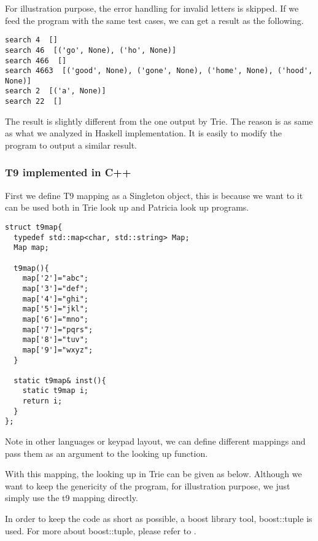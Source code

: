\documentclass{article}
\begin{document}
For illustration purpose, the error handling for invalid letters is skipped.
If we feed the program with the same test cases, we can get a result as the
following.

\begin{verbatim}
search 4  []
search 46  [('go', None), ('ho', None)]
search 466  []
search 4663  [('good', None), ('gone', None), ('home', None), ('hood', None)]
search 2  [('a', None)]
search 22  []
\end{verbatim}

The result is slightly different from the one output by Trie. The reason is
as same as what we analyzed in Haskell implementation. It is easily to modify
the program to output a similar result.

\subsubsection*{T9 implemented in C++}

First we define T9 mapping as a Singleton object, this is because we
want to it can be used both in Trie look up and Patricia look up programs.

\lstset{language=C++}
\begin{lstlisting}
struct t9map{
  typedef std::map<char, std::string> Map;
  Map map;

  t9map(){
    map['2']="abc";
    map['3']="def";
    map['4']="ghi";
    map['5']="jkl";
    map['6']="mno";
    map['7']="pqrs";
    map['8']="tuv";
    map['9']="wxyz";
  }

  static t9map& inst(){
    static t9map i;
    return i;
  }
};
\end{lstlisting}

Note in other languages or keypad layout, we can define different
mappings and pass them as an argument to the looking up function.

With this mapping, the looking up in Trie can be given as
below. Although we want to keep the genericity of the program, for
illustration purpose, we just simply use the t9 mapping directly.

In order to keep the code as short as possible, a boost library tool,
boost::tuple is used. For more about boost::tuple, please refer to \cite{boost-book}.
\end{document}
